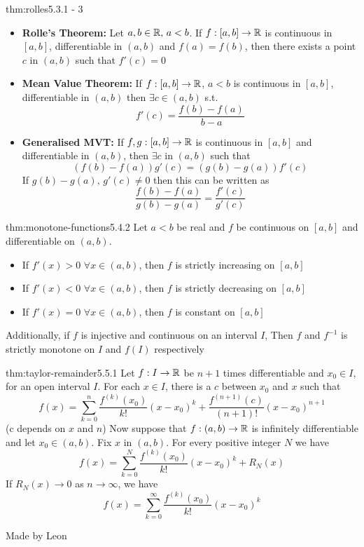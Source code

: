 \documentclass[landscape, 8pt]{extarticle}
\begin{document}
\begin{multicols}{3}
\begin{thm}{thm:rolles}{5.3.1 - 3}
    \renewcommand\labelitemi{\tiny$\bullet$}
    \begin{itemize}
        \setlength\itemsep{0em}
        \item \textbf{Rolle's Theorem:} Let $a,b\in \mathbb{R},\,a<b$. If $f:[a,b] \to \mathbb{R}$ is continuous in $[a,b]$, differentiable in $(a,b)$ and $f(a)=f(b)$, then there exists a point $c$ in $(a,b)$ such that $f'(c)=0$
        \item \textbf{Mean Value Theorem:} If $f:[a,b]\to\mathbb{R}$, $a<b$ is continuous in $[a,b]$, differentiable in $(a,b)$ then $\exists c\in (a,b)$ s.t.
        \[f'(c)=\frac{f(b)-f(a)}{b-a}\]
        \item \textbf{Generalised MVT:} If $f,g:[a,b]\to\mathbb{R}$ is continuous in $[a,b]$ and differentiable in $(a,b)$, then $\exists c$ in $(a,b)$ such that
        \[(f(b)-f(a))g'(c)=(g(b)-g(a))f'(c)\]
        If $g(b)-g(a),\,g'(c)\ne 0$ then this can be written as
        \[\frac{f(b)-f(a)}{g(b)-g(a)}= \frac{f'(c)}{g'(c)}\]
    \end{itemize}
\end{thm}
\vspace{-8pt}

\begin{thm}{thm:monotone-functions}{5.4.2}
Let $a<b$ be real and $f$ be continuous on $[a,b]$ and differentiable on $(a,b)$.
\renewcommand\labelitemi{\tiny$\bullet$}
\begin{itemize}
    \setlength\itemsep{0em}
    \item If $f'(x) > 0\,\, \forall x\in (a,b)$, then $f$ is strictly increasing on $[a,b]$
    \item If $f'(x) < 0\,\, \forall x\in (a,b)$, then $f$ is strictly decreasing on $[a,b]$
    \item If $f'(x) = 0\,\, \forall x\in(a,b)$, then $f$ is constant on $[a,b]$
\end{itemize}
Additionally, if $f$ is injective and continuous on an interval $I$, Then $f$ and $f^{-1}$ is strictly monotone on $I$ and $f(I)$ respectively
\end{thm}
\vspace{-8pt}

\begin{thm}{thm:taylor-remainder}{5.5.1}
    Let $f:I\to\mathbb{R}$ be $n+1$ times differentiable and $x_{0}\in I$, for an open interval $I$. For each $x \in I$, there is a $c$ between $x_{0}$ and $x$ such that
    \[f(x)=\sum_{k=0}^{n} \frac{f^{(k)}(x_{0})}{k!} (x-x_{0})^k + \frac{f^{(n+1)}(c)}{(n+1)!}(x-x_{0})^{n+1}\]
    (c depends on $x$ and $n$)
    \vspace{0pt}\newline
    Now suppose that $f:(a,b)\to\mathbb{R}$ is infinitely differentiable and let $x_{0}\in (a,b)$. Fix $x$ in $(a,b)$. For every positive integer $N$ we have
    \[f(x)=\sum_{k=0}^{N} \frac{f^{(k)}(x_{0})}{k!}(x-x_{0})^{k} + R_{N}(x)\]
    If $R_{N}(x) \to 0$ as $n\to\infty$, we have
    \[f(x) = \sum_{k=0}^{\infty} \frac{f^{(k)}(x_{0})}{k!}(x-x_{0})^{k}\]
\end{thm}
\vspace{-8pt}
Made by Leon
\newpage


\end{multicols}
\end{document}
